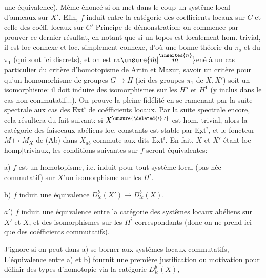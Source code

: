 
 une équivalence). Même énoncé si on met dans le
coup un  systême local d'anneaux sur \(X'\).
Efin, \(f\) induit 
 entre la catégorie des coefficients locaux sur \(C\) et celle
des coéff. locaux sur \(C'\) 
 Principe de démonstration: on commence
par prouver ce dernier résultat, en notant que  si un topos est
localement hom. trivial, il est loc connexe et loc. simplement connexe,
d'où une bonne théorie du \(\pi_o\) et du \(\pi_1\) (qui sont ici discrets), et on est
ra\(\unsure{\grave{m}|\overset{\inserted{n}}{m}}\)ené  à un cas particulier du critère d'homotopisme de Artin et
Mazur, savoir un critère  pour qu'un homomorhisme de groupes \(G\longrightarrow H\) (ici des
groupes \(\pi_1\) de \(X,X'\)) soit un isomorphisme: il doit induire des isomorphismes
sur les \(H^o\) et \(H^1\) (y inclus dans le cas non commutatif...). On prouve
la pleine fidélité en se ramenant par la suite spectrale aux cas des \(\mathrm{Ext}^i\)
de coéfficients locaux. Par la suite spectrale encore, cela résultera du
fait suivant: si \(X^{\unsure{\deleted{\prime}|\prime}}\) est
 hom. trivial, alors la catégorie des
faisceaux abéliens loc. constants est stable par \(\underline{\mathrm{Ext}}^i\), et le foncteur
\(M\longmapsto M_X\) de (Ab) dans \(X_{ab}\) commute aux dits \(\mathrm{Ext}^i\).
En fait, \(X\) et \(X'\) étant loc homp\(\mid\)triviaux, les conditions suivantes sur \(f\)
seront équivalentes:

a) \(f\) est un homotopisme, i.e. induit pour tout systême local (pas
néc commutatif) sur \(X'\)un isomorphisme sur les \(H^i\).

b)  \(f\) induit une équivalence \(D^b_{lc}(X')\longrightarrow D^b_{lc}(X)\).

\(a'\)) \(f\) induit une équivalence entre la catégorie des systêmes locaux
abéliens sur \(X'\) et \(X\), et des isomorphismes sur les \(H^i\) correspondants (donc
on ne prend ici que des coéfficients commutatifs).

 J'ignore si on peut dans a) se borner aux systêmes locaux commutatifs,
L'équivalence entre a) et b) fournit une première justification ou
motivation pour définir des types d'homotopie via la catégorie \(D^b_{lc}(X)\),

